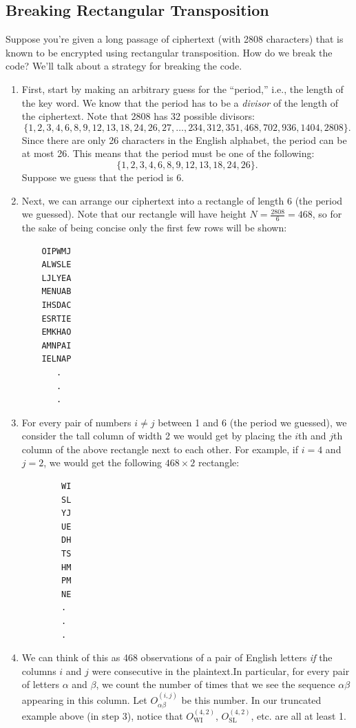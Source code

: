 \documentclass[letterpaper]{article}
\begin{document}
\subsection{Breaking Rectangular Transposition}
Suppose you're given a long passage of ciphertext (with 2808 characters) that is known to be encrypted using rectangular transposition. How do we break the code? We'll talk about a strategy for breaking the code. 
\begin{enumerate}
    \item First, start by making an arbitrary guess for the ``period,'' i.e., the length of the key word. We know that the period has to be a \emph{divisor} of the length of the ciphertext. Note that 2808 has 32 possible divisors: 
    \[\{1,2,3,4,6,8,9,12,13,18,24,26,27,\hdots,234,312,351,468,702,936,1404,2808\}.\]
    Since there are only 26 characters in the English alphabet, the period can be at most 26. This means that the period must be one of the following: 
    \[\{1,2,3,4,6,8,9,12,13,18,24,26\}.\]
    Suppose we guess that the period is 6.

    \item Next, we can arrange our ciphertext into a rectangle of length 6 (the period we guessed). Note that our rectangle will have height $N = \frac{2808}{6} = 468$, so for the sake of being concise only the first few rows will be shown: 
    \begin{verbatim}
    OIPWMJ
    ALWSLE
    LJLYEA
    MENUAB
    IHSDAC
    ESRTIE
    EMKHAO
    AMNPAI
    IELNAP
       .
       .
       .\end{verbatim}

    \item For every pair of numbers $i \neq j$ between 1 and 6 (the period we guessed), we consider the tall column of width 2 we would get by placing the $i$th and $j$th column of the above rectangle next to each other. For example, if $i = 4$ and $j = 2$, we would get the following $468 \times 2$ rectangle:
    \begin{verbatim}
        WI
        SL
        YJ
        UE
        DH
        TS
        HM
        PM
        NE
        .
        .
        .\end{verbatim}


    \item We can think of this as 468 observations of a pair of English letters \emph{if} the columns $i$ and $j$ were consecutive in the plaintext.In particular, for every pair of letters $\alpha$ and $\beta$, we count the number of times that we see the sequence $\alpha \beta$ appearing in this column. Let $O_{\alpha\beta}^{(i, j)}$ be this number. In our truncated example above (in step 3), notice that $O_{\text{WI}}^{(4, 2)}$, $O_{\text{SL}}^{(4, 2)}$, etc. are all at least 1.
    

\end{enumerate}
\end{document}
